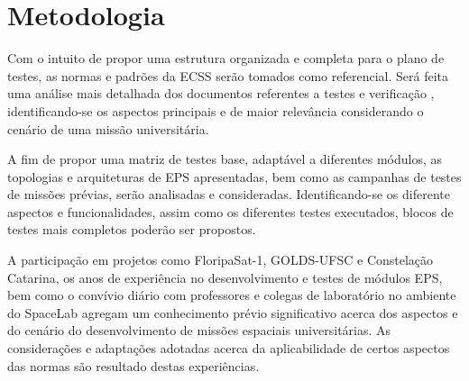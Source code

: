 \chapter{Metodologia}


Com o intuito de propor uma estrutura organizada e completa para o plano de testes, as normas e padrões da \gls{ECSS} serão tomados como referencial.
Será feita uma análise mais detalhada dos documentos referentes a testes \cite{ecss-e-st-10-03} e verificação \cite{ecss-e-st-10-02}, identificando-se os aspectos principais e de maior relevância considerando o cenário de uma missão universitária.

A fim de propor uma matriz de testes base, adaptável a diferentes módulos, as topologias e arquiteturas de \gls{EPS} apresentadas, bem como as campanhas de testes de missões prévias, serão analisadas e consideradas. Identificando-se os diferente aspectos e funcionalidades, assim como os diferentes testes executados, blocos de testes mais completos poderão ser propostos.

A participação em projetos como FloripaSat-1, GOLDS-UFSC e Constelação Catarina, os anos de experiência no desenvolvimento e testes de módulos \gls{EPS}, bem como o convívio diário com professores e colegas de laboratório no ambiente do SpaceLab agregam um conhecimento prévio significativo acerca dos aspectos e do cenário do desenvolvimento de missões espaciais universitárias.
As considerações e adaptações adotadas acerca da aplicabilidade de certos aspectos das normas são resultado destas experiências.